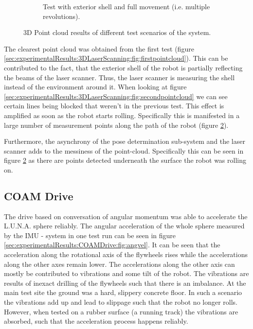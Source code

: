 \begin{figure}
\begin{subfigure}[b]{\textwidth}
	\caption{Test with exterior shell and full movement (i.e. multiple revolutions).}
	\label{sec:experimentalResults:3DLaserScanning:fig:thirdpointcloud}
\end{subfigure}
\caption{3D Point cloud results of different test scenarios of the system.}
\end{figure}

The clearest point cloud was obtained from the first test (figure \ref{sec:experimentalResults:3DLaserScanning:fig:firstpointcloud}). This can be contributed to the fact, that the exterior shell of the robot is partially reflecting the beams of the laser scanner. Thus, the laser scanner is measuring the shell instead of the environment around it. When looking at figure \ref{sec:experimentalResults:3DLaserScanning:fig:secondpointcloud} we can see certain lines being blocked that weren't in the previous test. This effect is amplified as soon as the robot starts rolling. Specifically this is manifested in a large number of measurement points along the path of the robot (figure \ref{sec:experimentalResults:3DLaserScanning:fig:thirdpointcloud}).

Furthermore, the asynchrony of the pose determination sub-system and the laser scanner adds to the messiness of the point-cloud. Specifically this can be seen in figure \ref{sec:experimentalResults:3DLaserScanning:fig:thirdpointcloud} as there are points detected underneath the surface the robot was rolling on. 

\subsection{COAM Drive}
\label{sec:experimentalResults:COAMDrive}

The drive based on conversation of angular momentum was able to accelerate the L.U.N.A. sphere reliably. The angular acceleration of the whole sphere measured by the IMU - system in one test run can be seen in figure \ref{sec:experimentalResults:COAMDrive:fig:angvel}. It can be seen that the acceleration along the rotational axis of the flywheels rises while the accelerations along the other axes remain lower. The accelerations along the other axis can mostly be contributed to vibrations and some tilt of the robot. The vibrations are results of inexact drilling of the flywheels such that there is an imbalance. At the main test site the ground was a hard, slippery concrete floor. In such a scenario the vibrations add up and lead to slippage such that the robot no longer rolls. However, when tested on a rubber surface (a running track) the vibrations are absorbed, such that the acceleration process happens reliably.

